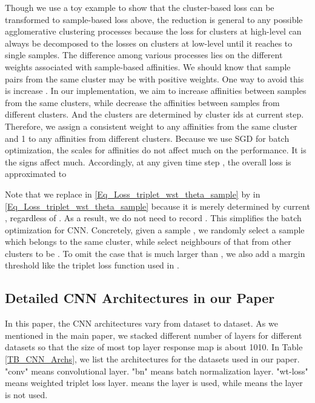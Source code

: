 \documentclass[10pt,twocolumn,letterpaper]{article}
\begin{document}
Though we use a toy example to show that the cluster-based loss can be transformed to sample-based loss above, the reduction is general to any possible agglomerative clustering processes because the loss for clusters at high-level can always be decomposed to the losses on clusters at low-level until it reaches to single samples. The difference among various processes lies on the different weights associated with sample-based affinities. We should know that sample pairs from the same cluster may be with positive weights. One way to avoid this is increase . In our implementation, we aim to increase affinities between samples from the same clusters, while decrease the affinities between samples from different clusters. And the clusters are determined by cluster ids at current step. Therefore, we assign a consistent weight  to any affinities from the same cluster and 1 to any affinities from different clusters. Because we use SGD for batch optimization, the scales for affinities do not affect much on the performance. It is the signs affect much. Accordingly, at any given time step , the overall loss is approximated to


Note that we replace  in \eqref{Eq_Loss_triplet_wst_theta_sample} by  in \eqref{Eq_Loss_triplet_wst_theta_sample} because it is merely determined by current , regardless of . As a result, we do not need to record . This simplifies the batch optimization for CNN. Concretely, given a sample , we randomly select a sample  which belongs to the same cluster, while select neighbours of  that from other clusters to be . To omit the case that  is much larger than , we also add a margin threshold like the triplet loss function used in \cite{wang2014learning, schroff2015facenet}.

\subsection{Detailed CNN Architectures in our Paper}
\label{Ap_Detailed_CNN}

In this paper, the CNN architectures vary from dataset to dataset. As we mentioned in the main paper, we stacked different number of layers for different datasets so that the size of most top layer response map is about 1010. In Table \ref{TB_CNN_Archs}, we list the architectures for the datasets used in our paper. "conv" means convolutional layer. "bn" means batch normalization layer. "wt-loss" means weighted triplet loss layer.  means the layer is used, while  means the layer is not used.
\end{document}
